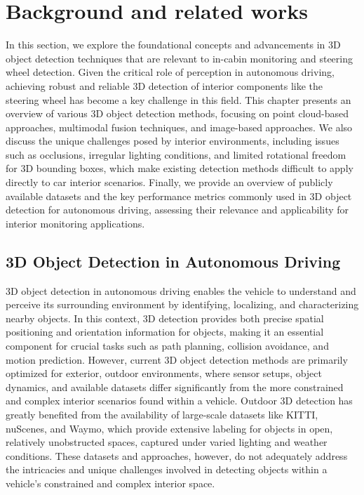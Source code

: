 \chapter{Background and related works}
In this section, we explore the foundational concepts and advancements 
in 3D object detection techniques that are relevant to 
in-cabin monitoring and steering wheel detection. Given the critical 
role of perception in autonomous driving, achieving robust and reliable 
3D detection of interior components like the steering wheel has become a 
key challenge in this field. This chapter presents an overview of 
various 3D object detection methods, focusing on point cloud-based 
approaches, multimodal fusion techniques, and image-based approaches. 
We also discuss the unique challenges posed by interior environments, 
including issues such as occlusions, irregular lighting conditions, 
and limited rotational freedom for 3D bounding boxes, which make 
existing detection methods difficult to apply directly to car interior 
scenarios. Finally, we provide an overview of publicly available 
datasets and the key performance metrics commonly used in 3D object 
detection for autonomous driving, assessing their relevance and 
applicability for interior monitoring applications.


\section{3D Object Detection in Autonomous Driving}
3D object detection in autonomous driving enables the vehicle to
understand and perceive its surrounding environment by identifying, 
localizing, and characterizing nearby objects. In this context, 
3D detection provides both precise spatial positioning and orientation 
information for objects, making it an essential component for crucial 
tasks such as path planning, collision avoidance, and motion prediction.
However, current 3D object detection methods are primarily optimized 
for exterior, outdoor environments, where sensor setups, object dynamics, 
and available datasets differ significantly from the more constrained and
complex interior scenarios found within a vehicle. Outdoor 3D detection
has greatly benefited from the availability of large-scale datasets like 
KITTI, nuScenes, and Waymo, which provide extensive labeling for objects 
in open, relatively unobstructed spaces, captured under varied lighting 
and weather conditions. These datasets and approaches, however, 
do not adequately address the intricacies and unique challenges 
involved in detecting objects within a vehicle's constrained and 
complex interior space.

